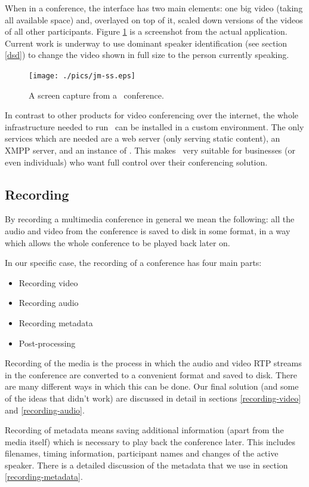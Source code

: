 \documentclass[twoside,openright,a4paper,12pt,english]{article}
\begin{document}
When in a conference, the interface has two main elements: one big video
(taking all available space) and, overlayed on top of it,
scaled down versions of the videos of all other participants. Figure
\ref{jm-ss} is a screenshot from the actual application. Current work is underway to
use dominant speaker identification (see section \ref{dsd}) to change the video
shown in full size to the person currently speaking.

\begin{figure}[h]
    \texttt{[image: ./pics/jm-ss.eps]}
    \caption{A screen capture from a \jm\ conference.}
    \label{jm-ss}
\end{figure}

\medskip
In contrast to other products for video conferencing over the internet, the
whole infrastructure needed to run \jm\ can be installed in a custom
environment. The only services which are needed are a web server
(only serving static content), an XMPP server, and an instance of \jvb. This
makes \jm\ very suitable for businesses (or even individuals) who want full
control over their conferencing solution.



\subsection{Recording}
\label{intro-recording}
By recording a multimedia conference in general we mean the following: all the
audio and video from the conference
is saved to disk in some format, in a way which allows the whole conference to
be played back later on.

\medskip
In our specific case, the recording of a conference has four main parts:
\begin{itemize}
\item{Recording video}
\item{Recording audio}
\item{Recording metadata}
\item{Post-processing}
\end{itemize}

Recording of the media is the process in which the audio and video RTP streams
in the conference are converted to a convenient format and saved to disk. There
are many different ways in which this can be done. Our final solution (and some
of the ideas that didn't work) are discussed in detail in
sections \ref{recording-video} and \ref{recording-audio}.

Recording of metadata means saving additional information (apart from the media
itself) which is necessary to play back the conference later. This includes filenames,
timing information, participant names and changes of the active speaker. There
is a detailed discussion of the
metadata that we use in section \ref{recording-metadata}.
\end{document}
